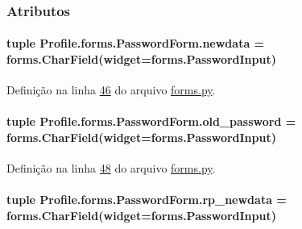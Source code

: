 \subsubsection{Atributos}
\hypertarget{classProfile_1_1forms_1_1PasswordForm_a8000a7fa167f74f0cd554f39dd1e3871}{
\paragraph[{newdata}]{\setlength{\rightskip}{0pt plus 5cm}tuple Profile.\-forms.\-Password\-Form.\-newdata = forms.\-Char\-Field(widget=forms.\-Password\-Input)\hspace{0.3cm}{\ttfamily [static]}}}\label{classProfile_1_1forms_1_1PasswordForm_a8000a7fa167f74f0cd554f39dd1e3871}


Definição na linha \hyperlink{Profile_2forms_8py_source_l00046}{46} do arquivo \hyperlink{Profile_2forms_8py_source}{forms.\-py}.

\hypertarget{classProfile_1_1forms_1_1PasswordForm_a71438e4977095210067fd7d2f4cf551c}{
\paragraph[{old\-\_\-password}]{\setlength{\rightskip}{0pt plus 5cm}tuple Profile.\-forms.\-Password\-Form.\-old\-\_\-password = forms.\-Char\-Field(widget=forms.\-Password\-Input)\hspace{0.3cm}{\ttfamily [static]}}}\label{classProfile_1_1forms_1_1PasswordForm_a71438e4977095210067fd7d2f4cf551c}


Definição na linha \hyperlink{Profile_2forms_8py_source_l00048}{48} do arquivo \hyperlink{Profile_2forms_8py_source}{forms.\-py}.

\hypertarget{classProfile_1_1forms_1_1PasswordForm_a7560db05a7e3dfebdd4e95385192b2ad}{
\paragraph[{rp\-\_\-newdata}]{\setlength{\rightskip}{0pt plus 5cm}tuple Profile.\-forms.\-Password\-Form.\-rp\-\_\-newdata = forms.\-Char\-Field(widget=forms.\-Password\-Input)\hspace{0.3cm}{\ttfamily [static]}}}\label{classProfile_1_1forms_1_1PasswordForm_a7560db05a7e3dfebdd4e95385192b2ad}


